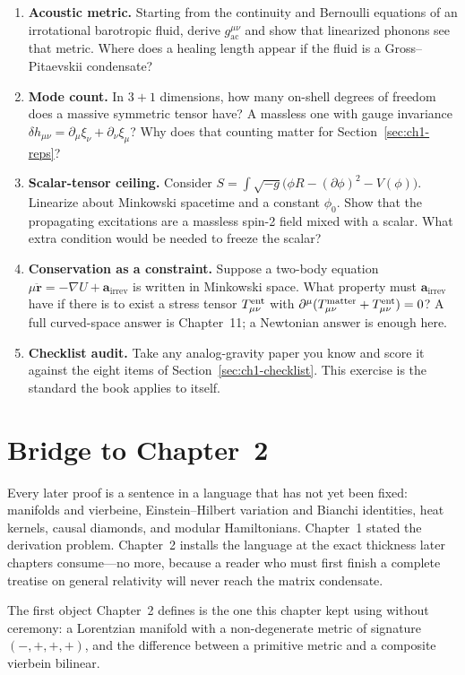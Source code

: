 \begin{enumerate}
  \item \textbf{Acoustic metric.}
    Starting from the continuity and Bernoulli equations of an
    irrotational barotropic fluid, derive \(g_{\mathrm{ac}}^{\mu\nu}\)
    and show that linearized phonons see that metric. Where does a
    healing length appear if the fluid is a Gross--Pitaevskii
    condensate?
  \item \textbf{Mode count.}
    In \(3+1\) dimensions, how many on-shell degrees of freedom does a
    massive symmetric tensor have? A massless one with gauge invariance
    \(\delta h_{\mu\nu}=\partial_\mu\xi_\nu+\partial_\nu\xi_\mu\)?
    Why does that counting matter for Section~\ref{sec:ch1-reps}?
  \item \textbf{Scalar-tensor ceiling.}
    Consider
    \(S=\int\sqrt{-g}\bigl(\phi R-(\partial\phi)^2-V(\phi)\bigr)\).
    Linearize about Minkowski spacetime and a constant \(\phi_0\).
    Show that the propagating excitations are a massless spin-2 field
    mixed with a scalar. What extra condition would be needed to freeze
    the scalar?
  \item \textbf{Conservation as a constraint.}
    Suppose a two-body equation
    \(\mu\ddot{\mathbf{r}}=-\nabla U+\mathbf{a}_{\mathrm{irrev}}\) is
    written in Minkowski space. What property must
    \(\mathbf{a}_{\mathrm{irrev}}\) have if there is to exist a stress
    tensor \(T^{\mathrm{ent}}_{\mu\nu}\) with
    \(\partial^\mu(T^{\mathrm{matter}}_{\mu\nu}+T^{\mathrm{ent}}_{\mu\nu})=0\)?
    A full curved-space answer is Chapter~11; a Newtonian answer is
    enough here.
  \item \textbf{Checklist audit.}
    Take any analog-gravity paper you know and score it against the
    eight items of Section~\ref{sec:ch1-checklist}. This exercise is
    the standard the book applies to itself.
\end{enumerate}

\section{Bridge to Chapter~2}
\label{sec:ch1-bridge}

Every later proof is a sentence in a language that has not yet been
fixed: manifolds and vierbeine, Einstein--Hilbert variation and Bianchi
identities, heat kernels, causal diamonds, and modular Hamiltonians.
Chapter~1 stated the derivation problem. Chapter~2 installs the
language at the exact thickness later chapters consume---no more,
because a reader who must first finish a complete treatise on general
relativity will never reach the matrix condensate.

The first object Chapter~2 defines is the one this chapter kept using
without ceremony: a Lorentzian manifold with a non-degenerate metric of
signature \((-,+,+,+)\), and the difference between a primitive metric
and a composite vierbein bilinear.